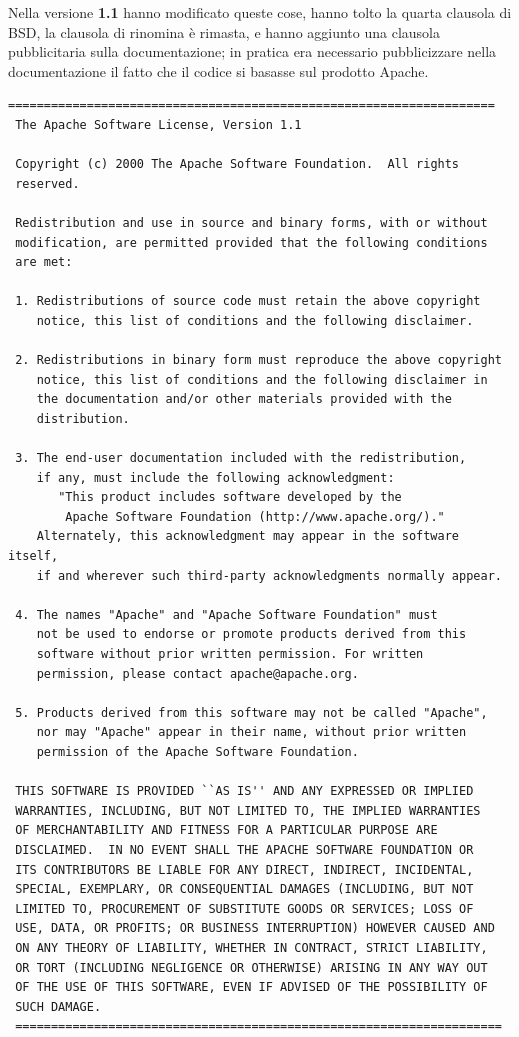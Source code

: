 Nella versione \textbf{1.1} hanno modificato queste cose, hanno tolto la quarta clausola di BSD, la clausola di rinomina è rimasta, e hanno aggiunto una clausola pubblicitaria sulla documentazione; in pratica era necessario pubblicizzare nella documentazione il fatto che il codice si basasse sul prodotto Apache. 

\begin{lstlisting}[caption=licenza Apache 1.1]
 ====================================================================
 The Apache Software License, Version 1.1

 Copyright (c) 2000 The Apache Software Foundation.  All rights
 reserved.

 Redistribution and use in source and binary forms, with or without
 modification, are permitted provided that the following conditions
 are met:

 1. Redistributions of source code must retain the above copyright
    notice, this list of conditions and the following disclaimer.

 2. Redistributions in binary form must reproduce the above copyright
    notice, this list of conditions and the following disclaimer in
    the documentation and/or other materials provided with the
    distribution.

 3. The end-user documentation included with the redistribution,
    if any, must include the following acknowledgment:
       "This product includes software developed by the
        Apache Software Foundation (http://www.apache.org/)."
    Alternately, this acknowledgment may appear in the software itself,
    if and wherever such third-party acknowledgments normally appear.

 4. The names "Apache" and "Apache Software Foundation" must
    not be used to endorse or promote products derived from this
    software without prior written permission. For written
    permission, please contact apache@apache.org.

 5. Products derived from this software may not be called "Apache",
    nor may "Apache" appear in their name, without prior written
    permission of the Apache Software Foundation.

 THIS SOFTWARE IS PROVIDED ``AS IS'' AND ANY EXPRESSED OR IMPLIED
 WARRANTIES, INCLUDING, BUT NOT LIMITED TO, THE IMPLIED WARRANTIES
 OF MERCHANTABILITY AND FITNESS FOR A PARTICULAR PURPOSE ARE
 DISCLAIMED.  IN NO EVENT SHALL THE APACHE SOFTWARE FOUNDATION OR
 ITS CONTRIBUTORS BE LIABLE FOR ANY DIRECT, INDIRECT, INCIDENTAL,
 SPECIAL, EXEMPLARY, OR CONSEQUENTIAL DAMAGES (INCLUDING, BUT NOT
 LIMITED TO, PROCUREMENT OF SUBSTITUTE GOODS OR SERVICES; LOSS OF
 USE, DATA, OR PROFITS; OR BUSINESS INTERRUPTION) HOWEVER CAUSED AND
 ON ANY THEORY OF LIABILITY, WHETHER IN CONTRACT, STRICT LIABILITY,
 OR TORT (INCLUDING NEGLIGENCE OR OTHERWISE) ARISING IN ANY WAY OUT
 OF THE USE OF THIS SOFTWARE, EVEN IF ADVISED OF THE POSSIBILITY OF
 SUCH DAMAGE.
 ====================================================================


\end{lstlisting}
